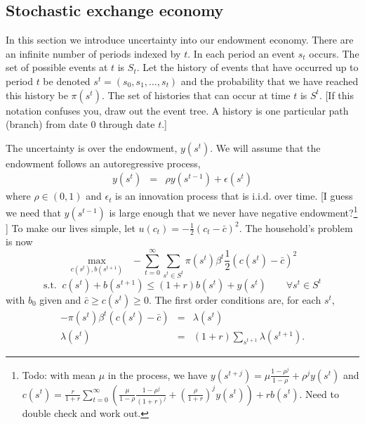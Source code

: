 \documentclass[11pt,pdftex,twoside,letterpaper]{exam}
\begin{document}
\subsection{Stochastic exchange economy}
In this section we introduce uncertainty into our endowment economy. There are an infinite number of periods indexed by $t$. In each period an event $s_t$ occurs. The set of possible events at $t$ is $S_t$. Let the history of events that have occurred up to period $t$ be denoted $s^t=(s_0, s_1,\dots , s_t)$ and the probability that we have reached this history be $\pi(s^t)$. The set of histories that can occur at time $t$ is $S^t$. [If this notation confuses you, draw out the event tree. A history is one particular path (branch) from date 0 through date $t$.]


The uncertainty is over the endowment, $y(s^t)$. We will assume that the endowment follows an autoregressive process,
\begin{eqnarray}
  y(s^{t}) &=& \rho y(s^{t-1})+\epsilon(s^t) \label{eq:stoch-process}
\end{eqnarray}
where $\rho\in (0,1)$ and $\epsilon_t$ is an innovation process that is i.i.d. over time. [I guess we need that $y(s^{t-1})$ is large enough that we never have negative endowment?\footnote{Todo: with mean $\mu$ in the process, we have $y(s^{t+j})=\mu\frac{1-\rho^j}{1-\rho}+\rho^j y(s^t)$ and $c(s^t)=\frac{r}{1+r}\sum_{t=0}^{\infty} \left( \frac{\mu}{1-\rho}\frac{1-\rho^j}{(1+r)^j}+\left(\frac{\rho}{1+r}\right)^j y(s^t)\right)+rb(s^t)$. Need to double check and work out.} ]
To make our lives simple, let $u(c_t)=-\frac{1}{2}\left(c_t - \bar{c}\right)^2$. The household's problem is now
\begin{equation}
 \max_{c(s^t),b(s^{t+1})} \;\; -\sum_{t=0}^\infty \sum_{s^t\in S^t} \pi(s^t) \beta^t\frac{1}{2}\left(c(s^t) -\bar{c}\right)^2
\end{equation}
\begin{equation}
  \textrm{s.t.}\;\; c(s^t)+b(s^{t+1}) \leq  (1+r)b(s^t) +y(s^t)\qquad \forall s^t\in S^t
\end{equation}
with $b_0$ given and $\bar{c}\geq c(s^t)\geq0$. The first order conditions are, for each $s^t$,
\begin{eqnarray}
  -\pi(s^t)\beta^t \left(c(s^t) -\bar{c}\right) &=& \lambda(s^t)\\
  \lambda(s^t)& =& (1+r) \sum_{s^{t+1}} \lambda(s^{t+1}).
\end{eqnarray}
\end{document}
